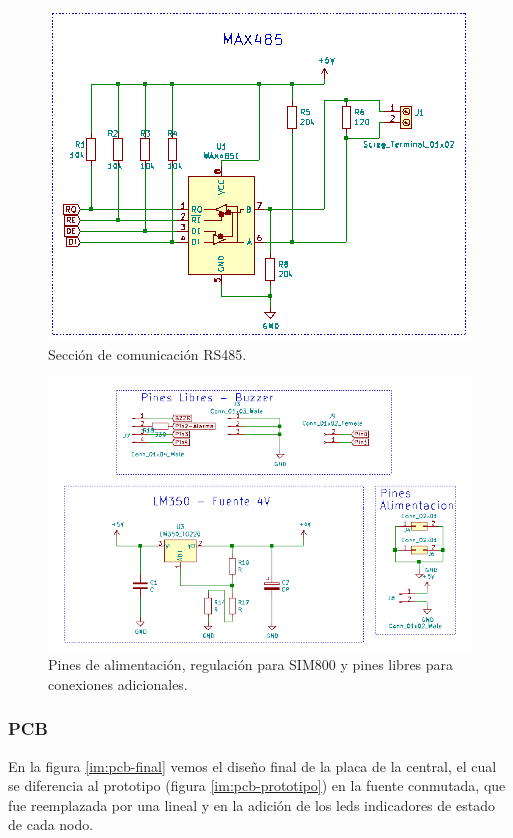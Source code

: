 \begin{figure}[!h]
	\centering
	\includegraphics[scale=.59]{images/central/central-esq-2.png}
    \caption{Sección de comunicación RS485.}
	\label{im:esq-central-2}
\end{figure}

\begin{figure}[!h]
	\centering
	\includegraphics[scale=.55]{images/central/central-esq-3.png}
    \caption{Pines de alimentación, regulación para SIM800 y pines libres para conexiones adicionales.}
	\label{im:esq-central-3}
\end{figure}

\subsubsection{PCB}
En la figura \ref{im:pcb-final} vemos el diseño final de la placa de la central, el cual se diferencia al prototipo (figura \ref{im:pcb-prototipo}) en la fuente conmutada, que fue reemplazada por una lineal y en la adición de los leds indicadores de estado de cada nodo. 

